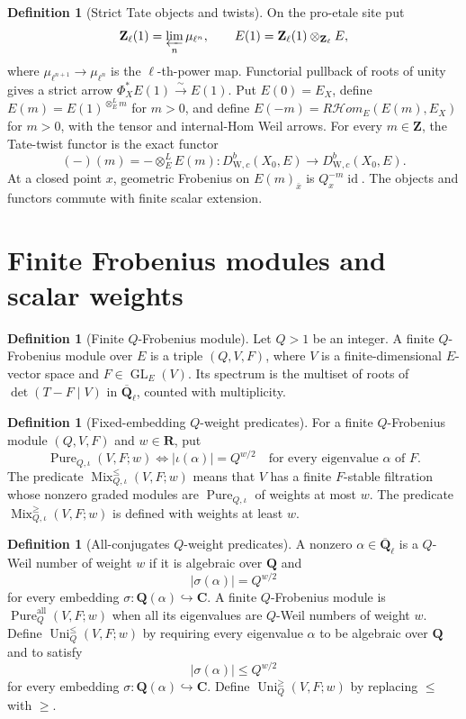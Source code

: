 \documentclass[10pt]{article}
\theoremstyle{definition}
\newtheorem{definition}[theorem]{Definition}
\newcommand{\Qlb}{\overline{\mathbf Q}_\ell}
\newcommand{\WeilD}{D^b_{\mathrm W,c}}
\newcommand{\MixLe}{\operatorname{Mix}^{\leq}}
\newcommand{\MixGe}{\operatorname{Mix}^{\geq}}
\newcommand{\UniLe}{\operatorname{Uni}^{\leq}}
\newcommand{\UniGe}{\operatorname{Uni}^{\geq}}
\newcommand{\Pure}{\operatorname{Pure}}
\newcommand{\RHom}{R\mathcal Hom}
\begin{document}
\begin{definition}[Strict Tate objects and twists]
On the pro-etale site put
\[
 \mathbf Z_\ell(1)=\varprojlim_n\mu_{\ell^n},
 \qquad E(1)=\mathbf Z_\ell(1)\otimes_{\mathbf Z_\ell}E,
\]
where \(\mu_{\ell^{n+1}}\to\mu_{\ell^n}\) is the \(\ell\)-th-power map.
Functorial pullback of roots of unity gives a strict arrow
\(\Phi_X^*E(1)\xrightarrow{\sim}E(1)\).  Put \(E(0)=E_X\), define
\(E(m)=E(1)^{\otimes_E^Lm}\) for \(m>0\), and define
\(E(-m)=\RHom_E(E(m),E_X)\) for \(m>0\), with the tensor and
internal-Hom Weil arrows.  For every \(m\in\mathbf Z\), the Tate-twist
functor is the exact functor
\[
 (-)(m)=-\otimes_E^LE(m):\WeilD(X_0,E)\longrightarrow\WeilD(X_0,E).
\]
At a closed point \(x\), geometric Frobenius on \(E(m)_{\bar x}\) is
\(Q_x^{-m}\operatorname{id}\).  The objects and functors commute with
finite scalar extension.
\end{definition}

\section{Finite Frobenius modules and scalar weights}

\begin{definition}[Finite \(Q\)-Frobenius module]
Let \(Q>1\) be an integer.  A finite \(Q\)-Frobenius module over \(E\) is a
triple \((Q,V,F)\), where \(V\) is a finite-dimensional \(E\)-vector space
and \(F\in\operatorname{GL}_E(V)\).  Its spectrum is the multiset of roots
of \(\det(T-F\mid V)\) in \(\Qlb\), counted with multiplicity.
\end{definition}

\begin{definition}[Fixed-embedding \(Q\)-weight predicates]
For a finite \(Q\)-Frobenius module \((Q,V,F)\) and \(w\in\mathbf R\), put
\[
 \Pure_{Q,\iota}(V,F;w)
 \Longleftrightarrow
 |\iota(\alpha)|=Q^{w/2}
 \quad\text{for every eigenvalue }\alpha\text{ of }F.
\]
The predicate \(\MixLe_{Q,\iota}(V,F;w)\) means that \(V\) has a finite
\(F\)-stable filtration whose nonzero graded modules are
\(\Pure_{Q,\iota}\) of weights at most \(w\).  The predicate
\(\MixGe_{Q,\iota}(V,F;w)\) is defined with weights at least \(w\).
\end{definition}

\begin{definition}[All-conjugates \(Q\)-weight predicates]
A nonzero \(\alpha\in\Qlb\) is a \(Q\)-Weil number of weight \(w\) if it is
algebraic over \(\mathbf Q\) and
\[
                         |\sigma(\alpha)|=Q^{w/2}
\]
for every embedding \(\sigma:\mathbf Q(\alpha)\hookrightarrow\mathbf C\).
A finite \(Q\)-Frobenius module is
\(\Pure_Q^{\mathrm{all}}(V,F;w)\) when all its eigenvalues are \(Q\)-Weil
numbers of weight \(w\).  Define \(\UniLe_Q(V,F;w)\) by requiring every
eigenvalue \(\alpha\) to be algebraic over \(\mathbf Q\) and to satisfy
\[
                         |\sigma(\alpha)|\le Q^{w/2}
\]
for every embedding \(\sigma:\mathbf Q(\alpha)\hookrightarrow\mathbf C\).
Define \(\UniGe_Q(V,F;w)\) by replacing \(\leq\) with \(\geq\).
\end{definition}
\end{document}

